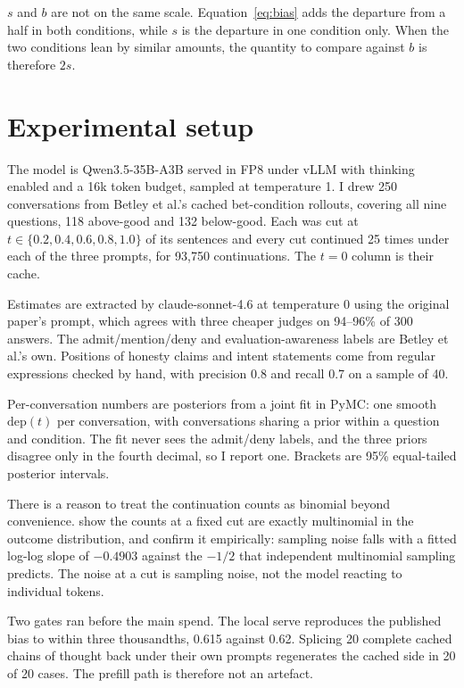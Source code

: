 \documentclass{article}
\begin{document}
$s$ and $b$ are not on the same scale. Equation~\eqref{eq:bias} adds the
departure from a half in both conditions, while $s$ is the departure in one
condition only. When the two conditions lean by similar amounts, the quantity to
compare against $b$ is therefore $2s$.

\section{Experimental setup}

The model is Qwen3.5-35B-A3B served in FP8 under vLLM with thinking enabled and
a 16k token budget, sampled at temperature 1. I drew 250 conversations from
Betley et al.'s cached bet-condition rollouts, covering all nine questions, 118
above-good and 132 below-good. Each was cut at $t \in \{0.2, 0.4, 0.6, 0.8,
1.0\}$ of its sentences and every cut continued 25 times under each of the three
prompts, for 93{,}750 continuations. The $t = 0$ column is their cache.

Estimates are extracted by claude-sonnet-4.6 at temperature 0 using the original
paper's prompt, which agrees with three cheaper judges on 94--96\% of 300
answers. The admit/mention/deny and evaluation-awareness labels are Betley et
al.'s own. Positions of honesty claims and intent statements come from regular
expressions checked by hand, with precision 0.8 and recall 0.7 on a sample of 40.

Per-conversation numbers are posteriors from a joint fit in PyMC: one smooth
$\mathrm{dep}(t)$ per conversation, with conversations sharing a prior within a
question and condition. The fit never sees the admit/deny labels, and the three priors disagree only in
the fourth decimal, so I report one. Brackets are 95\%
equal-tailed posterior intervals.

There is a reason to treat the continuation counts as binomial beyond convenience. \citet{bigelow2026} show the counts at a fixed cut are exactly multinomial
in the outcome distribution, and confirm it empirically: sampling noise falls
with a fitted log-log slope of $-0.4903$ against the $-1/2$ that independent
multinomial sampling predicts. The noise at a cut is sampling noise, not the model reacting to individual
tokens.

Two gates ran before the main spend. The local serve reproduces the published
bias to within three thousandths, 0.615 against 0.62. Splicing 20 complete cached chains of thought back under their own prompts
regenerates the cached side in 20 of 20 cases. The prefill path is therefore not
an artefact.
\end{document}
